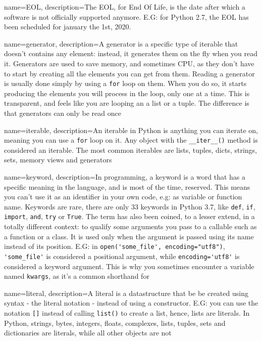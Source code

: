 {
    name=EOL,
    description={The EOL, for End Of Life, is the date after which a software is not officially supported anymore. E.G: for Python 2.7, the EOL has been scheduled for january the 1st, 2020.}
}

{
    name=generator,
    description={A generator is a specific type of \gls{iterable} that doesn't contains any element: instead, it generates them on the fly when you read it. Generators are used to save memory, and sometimes CPU, as they don't have to start by creating all the elements you can get from them. Reading a generator is usually done simply by using a \lstinline{for} loop on them. When you do so, it starts producing the elements you will process in the loop, only one at a time. This is transparent, and feels like you are looping an a list or a tuple. The difference is that generators can only be read once}
}


{
    name=iterable,
    description={An iterable in Python is anything you can iterate on, meaning you can use a \lstinline{for} loop on it. Any object with the \lstinline{__iter__()} method is considered an iterable. The most common iterables are lists, tuples, dicts, strings, sets, memory views and generators}
}


{
    name=keyword,
    description={In programming, a keyword is a word that has a specific meaning in the language, and is most of the time, reserved. This means you can't use it as an identifier in your own code, e.g: as variable or function name. Keywords are rare, there are only 33 keywords in Python 3.7, like \lstinline{def}, \lstinline{if}, \lstinline{import}, \lstinline{and}, \lstinline{try} or \lstinline{True}. The term  has also been coined, to a lesser extend, in a totally different context: to qualify some arguments you pass to a \gls{callable} such as a function or a class. It is used only when the argument is passed using its name instead of its position. E.G: in \lstinline{open('some_file', encoding="utf8")}, \lstinline{'some_file'} is considered a positional argument, while \lstinline{encoding='utf8'} is considered a keyword argument. This is why you sometimes encounter a variable named \lstinline{kwargs}, as it's a common shorthand for }
}

{
    name=literal,
    description={A literal is a datastructure that be be created using syntax - the literal notation - instead of using a constructor. E.G: you can use the notation \lstinline{[]} instead of calling  \lstinline{list()} to create a list, hence, lists are literals. In Python, strings, bytes, integers, floats, complexes, lists, tuples, sets and dictionaries are literals, while all other objects are not}
}

